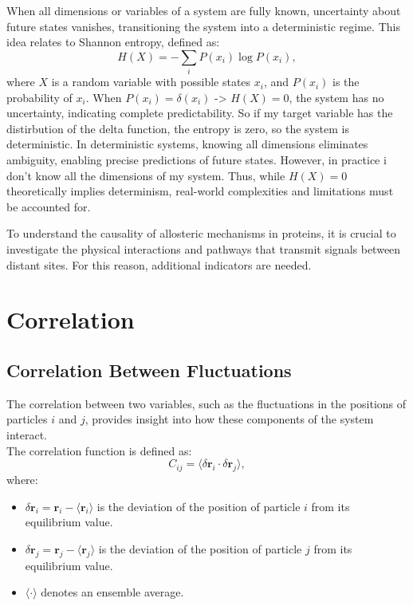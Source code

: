 \documentclass[English, Lau, oneside]{sapthesis}
\begin{document}
\noindent When all dimensions or variables of a system are fully known, uncertainty about future states vanishes, transitioning the system into a deterministic regime. This idea relates to Shannon entropy, defined as:
\[
H(X) = -\sum_{i} P(x_i) \log P(x_i),
\]
where \( X \) is a random variable with possible states \( x_i \), and \( P(x_i) \) is the probability of \( x_i \). When \( P(x_i) = \delta(x_i) \) -> \( H(X) = 0 \), the system has no uncertainty, indicating complete predictability.
So if my target variable has the distirbution of the delta function, the entropy is zero, so the system is deterministic.
In deterministic systems, knowing all dimensions eliminates ambiguity, enabling precise predictions of future states. However, in practice i don't know all the dimensions of my system.
Thus, while \( H(X) = 0 \) theoretically implies determinism, real-world complexities and limitations must be accounted for.


To understand the causality of allosteric mechanisms in proteins, it is crucial to investigate the physical interactions and pathways that transmit signals between distant sites. For this reason, additional indicators are needed.
\newpage
\section{Correlation}
\subsection{Correlation Between Fluctuations}
\noindent
The correlation between two variables, such as the fluctuations in the positions of particles \( i \) and \( j \), provides insight into how these components of the system interact.\\
The correlation function is defined as:\cite{ref13}
\begin{equation}
    C_{ij} = \langle \delta \mathbf{r}_i \cdot \delta \mathbf{r}_j \rangle, \label{correlation}
\end{equation}
where:
\begin{itemize}
    \item \( \delta \mathbf{r}_i = \mathbf{r}_i - \langle \mathbf{r}_i \rangle \) is the deviation of the position of particle \( i \) from its equilibrium value.
    \item \( \delta \mathbf{r}_j = \mathbf{r}_j - \langle \mathbf{r}_j \rangle \) is the deviation of the position of particle \( j \) from its equilibrium value.
    \item \( \langle \cdot \rangle \) denotes an ensemble average.
\end{itemize}
\end{document}

